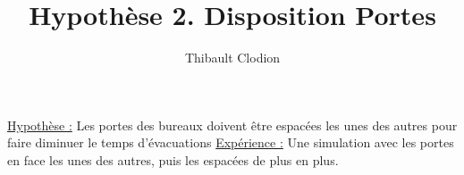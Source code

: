 \documentclass[12pt]{article}
\title{Hypothèse 2. Disposition Portes}
\author{Thibault Clodion}
\begin{document}
\maketitle %

\underline{Hypothèse :} Les portes des bureaux doivent être espacées les unes des autres pour faire diminuer le temps d'évacuations
\newline\newline
\underline{Expérience :} Une simulation avec les portes en face les unes des autres, puis les espacées de plus en plus.
\newline\newline
\end{document}
